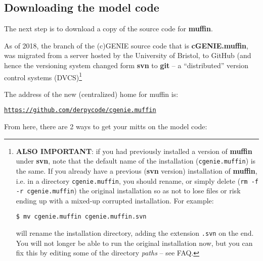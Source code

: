 \documentclass[11pt,fleqn]{book} %
\begin{document}

\subsection{Downloading the model code}

The next step is to download a copy of the source code for \textbf{muffin}.

As of 2018, the branch of the (c)GENIE source code that is \textbf{cGENIE.muffin}, was migrated from a server hosted by the University of Bristol, to GitHub (and hence the versioning system changed form \textbf{svn} to \textbf{git} -- a “distributed” version control systems (DVCS)\footnote{\textbf{ALSO IMPORTANT}: if you had previously installed a version of \textbf{muffin} under \textbf{svn}, note that the default name of the installation (\texttt{cgenie.muffin}) is the same. If you already have a previous (\textbf{svn} version) installation of \textbf{muffin}, i.e. in a directory \texttt{cgenie.muffin}, you should rename, or simply delete (\texttt{rm -f -r cgenie.muffin}) the original installation so as not to lose files or risk ending up with a mixed-up corrupted installation. For example:

\texttt{\$ mv cgenie.muffin cgenie.muffin.svn}

\noindent will rename the installation directory, adding the extension \texttt{.svn} on the end. You will not longer be able to run the original installation now, but you can fix this by editing some of the directory \textit{paths} -- see FAQ.}

The address of the new (centralized) home for muffin is:

\vspace{2mm}
\href{https://github.com/derpycode/cgenie.muffin}{\texttt{https://github.com/derpycode/cgenie.muffin}}
\vspace{2mm}


From here, there are 2 ways to get your mitts on the model code:
\end{document}
